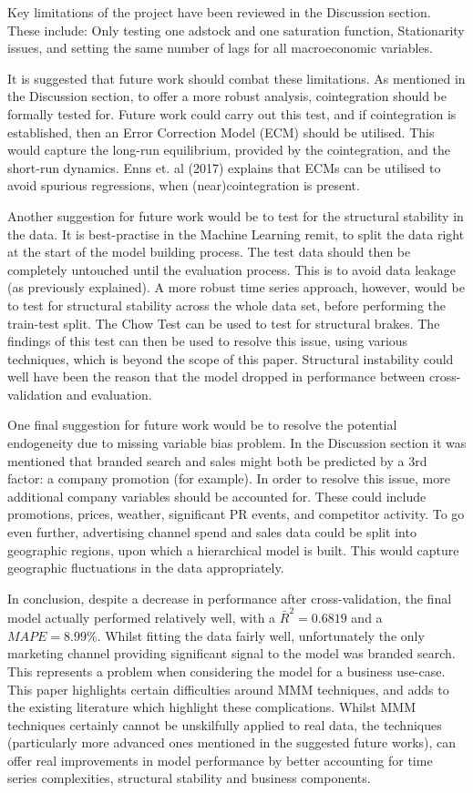 \documentclass[11pt, a4paper]{article}
\begin{document}
Key limitations of the project have been reviewed in the Discussion section. These include: Only testing one adstock and one saturation function, Stationarity issues, and setting the same number of lags for all macroeconomic variables. 

It is suggested that future work should combat these limitations. As mentioned in the Discussion section, to offer a more robust analysis, cointegration should be formally tested for. Future work could carry out this test, and if cointegration is established, then an Error Correction Model (ECM) should be utilised. This would capture the long-run equilibrium, provided by the cointegration, and the short-run dynamics. Enns et. al (2017) explains that ECMs can be utilised to avoid spurious regressions, when (near)cointegration is present. 

Another suggestion for future work would be to test for the structural stability in the data. It is best-practise in the Machine Learning remit, to split the data right at the start of the model building process. The test data should then be completely untouched until the evaluation process. This is to avoid data leakage (as previously explained). A more robust time series approach, however, would be to test for structural stability across the whole data set, before performing the train-test split. The Chow Test can be used to test for structural brakes. The findings of this test can then be used to resolve this issue, using various techniques, which is beyond the scope of this paper. Structural instability could well have been the reason that the model dropped in performance between cross-validation and evaluation. 

One final suggestion for future work would be to resolve the potential endogeneity due to missing variable bias problem. In the Discussion section it was mentioned that branded search and sales might both be predicted by a 3rd factor: a company promotion (for example). In order to resolve this issue, more additional company variables should be accounted for. These could include promotions, prices, weather, significant PR events, and competitor activity. To go even further, advertising channel spend and sales data could be split into geographic regions, upon which a hierarchical model is built. This would capture geographic fluctuations in the data appropriately. 

In conclusion, despite a decrease in performance after cross-validation, the final model actually performed relatively well, with a $\bar{R}^2 = 0.6819$ and a $MAPE = 8.99\%$. Whilst fitting the data fairly well, unfortunately the only marketing channel providing significant signal to the model was branded search. This represents a problem when considering the model for a business use-case. This paper highlights certain difficulties around MMM techniques, and adds to the existing literature which highlight these complications. Whilst MMM techniques certainly cannot be unskilfully applied to real data, the techniques (particularly more advanced ones mentioned in the suggested future works), can offer real improvements in model performance by better accounting for time series complexities, structural stability and business components. 
\end{document}
